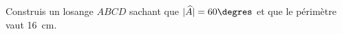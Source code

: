 %
%
	Construis un losange $ABCD$ sachant que $|\widehat{A}|= 60\degres$ et que le périmètre vaut \SI{16}{cm}.
